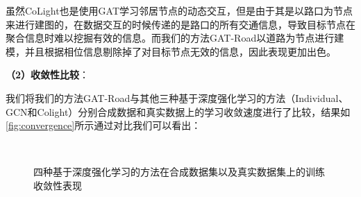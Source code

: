 虽然CoLight也是使用GAT学习邻居节点的动态交互，但是由于其是以路口为节点来进行建图的，在数据交互的时候传递的是路口的所有交通信息，导致目标节点在聚合信息时难以挖掘有效的信息。而我们的方法GAT-Road以道路为节点进行建模，并且根据相位信息剔除掉了对目标节点无效的信息，因此表现更加出色。

\textbf{（2）收敛性比较}：

我们将我们的方法GAT-Road与其他三种基于深度强化学习的方法（Individual、GCN和Colight）分别合成数据和真实数据上的学习收敛速度进行了比较，结果如\autoref{fig:convergence}所示通过对比我们可以看出：
\begin{figure}[t]
  \quad
  \\
  \quad
  \caption[]{四种基于深度强化学习的方法在合成数据集以及真实数据集上的训练收敛性表现}
  \label{fig:convergence}
\end{figure}
